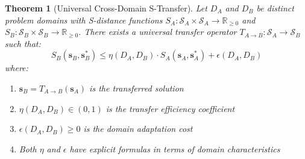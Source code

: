 \documentclass[11pt]{article}
\newtheorem{theorem}{Theorem}[section]
\theoremstyle{definition}
\theoremstyle{remark}
\newcommand{\Real}{\mathbb{R}}
\newcommand{\SEntropy}{\mathcal{S}}
\begin{document}
\begin{theorem}[Universal Cross-Domain S-Transfer]
\label{thm:cross_domain_complete}
Let $D_A$ and $D_B$ be distinct problem domains with S-distance functions $S_A: \SEntropy_A \times \SEntropy_A \to \Real_{\geq 0}$ and $S_B: \SEntropy_B \times \SEntropy_B \to \Real_{\geq 0}$. There exists a universal transfer operator $T_{A \to B}: \SEntropy_A \to \SEntropy_B$ such that:
\begin{equation}
S_B(\mathbf{s}_B, \mathbf{s}_B^*) \leq \eta(D_A, D_B) \cdot S_A(\mathbf{s}_A, \mathbf{s}_A^*) + \epsilon(D_A, D_B)
\end{equation}
where:
\begin{enumerate}
\item $\mathbf{s}_B = T_{A \to B}(\mathbf{s}_A)$ is the transferred solution
\item $\eta(D_A, D_B) \in (0, 1)$ is the transfer efficiency coefficient
\item $\epsilon(D_A, D_B) \geq 0$ is the domain adaptation cost
\item Both $\eta$ and $\epsilon$ have explicit formulas in terms of domain characteristics
\end{enumerate}
\end{theorem}
\end{document}
